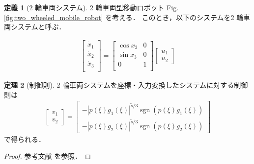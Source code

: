 \documentclass[a4j,10pt,onecolumn,oneside,titlepage,final]{jarticle}
\newcommand{\figref}[1]{Fig.\,\ref{#1}}
\newcommand{\sgn}{\operatorname{sgn}}
\theoremstyle{definition}
\newtheorem{definition}{定義}
\newtheorem{theorem}[definition]{定理}
\begin{document}
\begin{definition}[2 輪車両システム]
  \label{def:system}
  2 輪車両型移動ロボット \figref{fig:two_wheeled_mobile_robot} を考える．
  このとき，以下のシステムを2 輪車両システムと呼ぶ．

  \begin{align}
    \left[
      \begin{array}{c}
      \dot x_1 \\
      \dot x_2 \\
      \dot x_3 \\
      \end{array}
    \right]
    =
    \left[
      \begin{array}{cc}
      \cos x_3 & 0\\
      \sin x_3 & 0\\
      0 & 1 \\
      \end{array}
    \right]
    \left[
    \begin{array}{cc}
    u_1 \\
    u_2
    \end{array}
    \right]
    \label{system:two_wheeled_mobile_robot}
  \end{align}
\end{definition}

\begin{theorem}[制御則]
  \label{theo:controller}
  2 輪車両システムを座標・入力変換したシステムに対する制御則は
  \begin{align}
    \left[
      \begin{array}{c}
        v_1 \\
        v_2
      \end{array}
    \right]
    = 
    \left[
    \begin{array}{c}
      - \left| p(\xi) g_1(\xi) \right|^{\tilde s/ 3} \sgn \left( p(\xi) g_1(\xi) \right) \\
      - \left| p(\xi) g_2(\xi) \right|^{\tilde s/ 3} \sgn \left( p(\xi) g_2(\xi) \right)
    \end{array}
    \right]
    \label{eq:controller}
  \end{align}
  で得られる．
\end{theorem}

\begin{proof}
  参考文献\cite{sadasue2024} を参照．
\end{proof}
\end{document}
